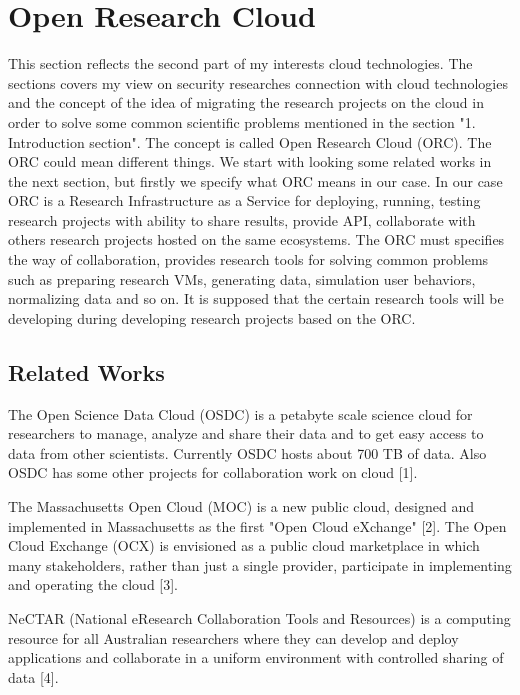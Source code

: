 %

\section{Open Research Cloud}
This section reflects the second part of my interests cloud technologies. The sections covers my view on security researches connection with cloud technologies and the concept of the idea of migrating the research projects on the cloud in order to solve some common scientific problems mentioned in the section "1. Introduction section". The concept is called Open Research Cloud (ORC). The ORC could mean different things. We start with looking some related works in the next section, but firstly we specify what ORC means in our case. In our case ORC is a Research Infrastructure as a Service for deploying, running, testing research projects with ability to share results, provide API, collaborate with others research projects hosted on the same ecosystems. The ORC must specifies the way of collaboration, provides research tools for solving common problems such as preparing research VMs, generating data, simulation user behaviors, normalizing data and so on. It is supposed that the certain research tools will be developing during developing research projects based on the ORC.  

\subsection{Related Works}
The Open Science Data Cloud (OSDC) is a petabyte scale science cloud for researchers to manage, analyze and share their data and to get easy access to data from other scientists. Currently OSDC hosts about 700 TB of data. Also OSDC has some other projects for collaboration work on cloud [1]. 

The Massachusetts Open Cloud (MOC) is a new public cloud, designed and implemented in Massachusetts as the first "Open Cloud eXchange" [2]. The Open Cloud Exchange (OCX) is envisioned as a public cloud marketplace in which many stakeholders, rather than just a single provider, participate in implementing and operating the cloud [3].

NeCTAR (National eResearch Collaboration Tools and Resources) is a computing resource for all Australian researchers where they can develop and deploy applications and collaborate in a uniform environment with controlled sharing of data [4]. 

